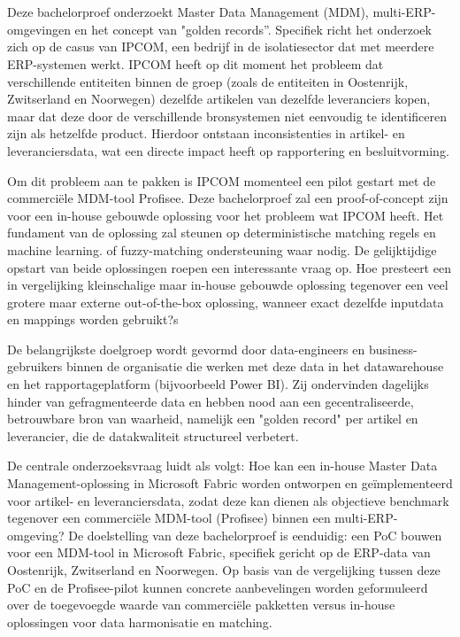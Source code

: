 
\chapter{}%
\label{ch:inleiding}
Deze bachelorproef onderzoekt Master Data Management (MDM), multi-ERP-omgevingen en het concept van "golden records''. Specifiek richt het onderzoek zich op de casus van IPCOM, een bedrijf in de isolatiesector dat met meerdere ERP-systemen werkt. IPCOM heeft op dit moment het probleem dat verschillende entiteiten binnen de groep (zoals de entiteiten in Oostenrijk, Zwitserland en Noorwegen) dezelfde artikelen van dezelfde leveranciers kopen, maar dat deze door de verschillende bronsystemen niet eenvoudig te identificeren zijn als hetzelfde product. Hierdoor ontstaan inconsistenties in artikel- en leveranciersdata, wat een directe impact heeft op rapportering en besluitvorming.

Om dit probleem aan te pakken is IPCOM momenteel een pilot gestart met de commerciële MDM-tool Profisee.
Deze bachelorproef zal een proof-of-concept zijn voor een in-house gebouwde oplossing voor het probleem wat IPCOM heeft. Het fundament van de oplossing zal steunen op deterministische matching regels en machine learning. of fuzzy-matching ondersteuning waar nodig. De gelijktijdige opstart van beide oplossingen roepen een interessante vraag op. Hoe presteert een in vergelijking kleinschalige maar in-house gebouwde oplossing tegenover een veel grotere maar externe out-of-the-box oplossing, wanneer exact dezelfde inputdata en mappings worden gebruikt?s

De belangrijkste doelgroep wordt gevormd door data-engineers en business-gebruikers binnen de organisatie die werken met deze data in het datawarehouse en het rapportageplatform (bijvoorbeeld Power BI). Zij ondervinden dagelijks hinder van gefragmenteerde data en hebben nood aan een gecentraliseerde, betrouwbare bron van waarheid, namelijk een "golden record" per artikel en leverancier, die de datakwaliteit structureel verbetert.

De centrale onderzoeksvraag luidt als volgt: Hoe kan een in-house Master Data Management-oplossing in Microsoft Fabric worden ontworpen en geïmplementeerd voor artikel- en leveranciersdata, zodat deze kan dienen als objectieve benchmark tegenover een commerciële MDM-tool (Profisee) binnen een multi-ERP-omgeving?
De doelstelling van deze bachelorproef is eenduidig: een PoC bouwen voor een MDM-tool in Microsoft Fabric, specifiek gericht op de ERP-data van Oostenrijk, Zwitserland en Noorwegen. Op basis van de vergelijking tussen deze PoC en de Profisee-pilot kunnen concrete aanbevelingen worden geformuleerd over de toegevoegde waarde van commerciële pakketten versus in-house oplossingen voor data harmonisatie en matching.

